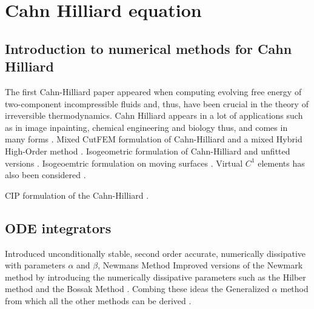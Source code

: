 
\newpage
\section{Cahn Hilliard equation }%
\label{sec:cahn_hilliard_equation}


\subsection{Introduction to numerical methods for Cahn Hilliard}%
\label{sub:introduction_to_numerical_methods_for_cahn_hilliard}

The first Cahn-Hilliard paper appeared when computing evolving free energy of two-component incompressible fluids  and, thus, have been crucial in the theory of irreversible thermodynamics.\cite{cahn1958free, cahn1959free, falk1992cahn}
Cahn Hilliard appears in a lot of applications such as in image inpainting, chemical engineering and biology \cite{bressloff2014stochastic} thus, and comes in many forms \cite{miranville2017cahn}.
Mixed CutFEM formulation of Cahn-Hilliard \cite{karatzas2021reduced} and a mixed Hybrid High-Order method \cite{chave2016hybrid}. Isogeometric formulation of Cahn-Hilliard \cite{kastner2016isogeometric, gomez2008isogeometric} and unfitted versions \cite{zhao2017variational}. Isogeoemtric formulation on moving
surfaces \cite{zimmermann2019isogeometric}. Virtual $C^{1}$  elements has also been considered \cite{antonietti2016c}.

CIP formulation of the Cahn-Hilliard \cite{wells2006discontinuous}.


\subsection{ODE integrators}%
\label{sub:ode_integrators}

      Introduced unconditionally stable, second order accurate, numerically dissipative with parameters $\alpha$ and $ \beta $,  Newmans Method \cite{newmark1959method}
    Improved versions of the Newmark method by introducing the numerically dissipative parameters such as the Hilber method and the Bossak Method \cite{hilber1977improved, wood1980alpha}. Combing these ideas the Generalized $\alpha $ method from which all the other methods can be derived \cite{chung1993time}.


\newpage

